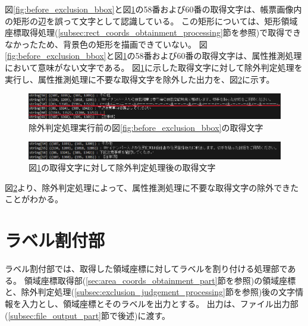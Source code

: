 図\ref{fig:before_exclusion_bbox}と図\ref{fig:before_exclusion_string}の58番および60番の取得文字は、帳票画像内の矩形の辺を誤って文字として認識している。
この矩形については、矩形領域座標取得処理(\ref{subsec:rect_coords_obtainment_processing}節を参照)で取得できなかったため、背景色の矩形を描画できていない。
図\ref{fig:before_exclusion_bbox}と図\ref{fig:before_exclusion_string}の58番および60番の取得文字は、属性推測処理において意味がない文字である。
図\ref{fig:before_exclusion_string}に示した取得文字に対して除外判定処理を実行し、属性推測処理に不要な取得文字を除外した出力を、図\ref{fig:after_exclusion_string}に示す。

\begin{figure}[tp]
    \begin{center}
        \includegraphics[width=15cm]{image/04-implementation/before_exclusion_string.png}
        \caption{除外判定処理実行前の図\ref{fig:before_exclusion_bbox}の取得文字}
        \label{fig:before_exclusion_string}
    \end{center}
\end{figure}

\begin{figure}[tp]
    \begin{center}
        \includegraphics[width=15cm]{image/04-implementation/after_exclusion_string.png}
        \caption{図\ref{fig:before_exclusion_string}の取得文字に対して除外判定処理後の取得文字}
        \label{fig:after_exclusion_string}
    \end{center}
\end{figure}

図\ref{fig:after_exclusion_string}より、除外判定処理によって、属性推測処理に不要な取得文字の除外できたことがわかる。

\section{ラベル割付部}\label{sec:label_link_part}
ラベル割付部では、取得した領域座標に対してラベルを割り付ける処理部である。
領域座標取得部(\ref{sec:area_coords_obtainment_part}節を参照)の領域座標と、除外判定処理(\ref{subsec:exclusion_judgement_processing}節を参照)後の文字情報を入力とし、領域座標とそのラベルを出力とする。
出力は、ファイル出力部(\ref{subsec:file_output_part}節で後述)に渡す。

